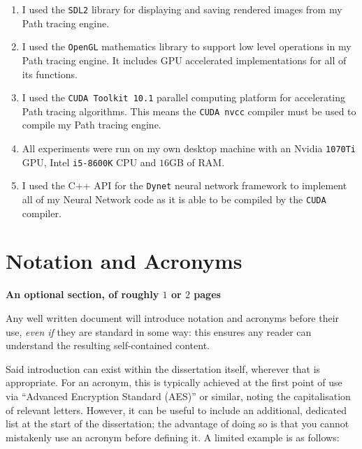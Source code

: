 \documentclass[ %
                    author={Callum Pearce},
                supervisor={Dr. Neill Campbell},
                    degree={MEng},
                     title={How effective are Temporal difference learning methods in reducing the number of zero contribution light paths in Path tracing?},
                  subtitle={},
                      type={research},
                      year={2019} ]{dissertation}
\begin{document}
\begin{enumerate}
\item I used the \verb|SDL2|  library for displaying and saving rendered 
images from my Path tracing engine.

\item I used the \verb|OpenGL| mathematics library to support low level 
operations in my Path tracing engine. It includes GPU accelerated 
 implementations for all of its functions.
 
\item I used the \verb|CUDA Toolkit 10.1| parallel computing platform for
 accelerating Path tracing algorithms. This means the \verb|CUDA nvcc|
 compiler must be used to compile my Path tracing engine.

\item All experiments were run on my own desktop machine with an
Nvidia \verb|1070Ti| GPU, Intel \verb|i5-8600K| CPU and $16$GB of RAM.

\item I used the C++ API for the \verb|Dynet| neural network framework 
to implement all of my Neural Network code as it is able to be compiled
by the \verb|CUDA| compiler.
\end{enumerate}


\chapter*{Notation and Acronyms}

{\bf An optional section, of roughly $1$ or $2$ pages}
\vspace{1cm} 

\noindent
Any well written document will introduce notation and acronyms before
their use, {\em even if} they are standard in some way: this ensures 
any reader can understand the resulting self-contained content.  

Said introduction can exist within the dissertation itself, wherever 
that is appropriate.  For an acronym, this is typically achieved at 
the first point of use via ``Advanced Encryption Standard (AES)'' or 
similar, noting the capitalisation of relevant letters.  However, it 
can be useful to include an additional, dedicated list at the start 
of the dissertation; the advantage of doing so is that you cannot 
mistakenly use an acronym before defining it.  A limited example is 
as follows:
\end{document}
